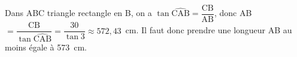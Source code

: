 
\medskip

%
%
Dans ABC  triangle rectangle en B, on a $\tan \widehat{\text{CAB}} = \dfrac{\text{CB}}{\text{AB}}$, donc AB $ =\dfrac{\text{CB}}{\tan \widehat{\text{CAB}}} = \dfrac{30}{\tan 3} \approx 572,43$~cm. Il faut donc prendre une longueur AB  au moins égale à 573~cm.
\vspace{0,5cm}

